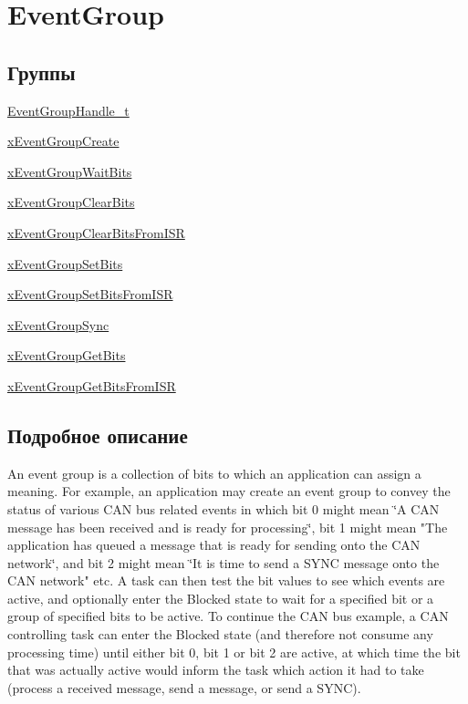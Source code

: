 \hypertarget{group___event_group}{}\section{Event\+Group}
\label{group___event_group}
\subsection*{Группы}
\begin{DoxyCompactItemize}
\item 
\mbox{\hyperlink{group___event_group_handle__t}{Event\+Group\+Handle\+\_\+t}}
\item 
\mbox{\hyperlink{group__x_event_group_create}{x\+Event\+Group\+Create}}
\item 
\mbox{\hyperlink{group__x_event_group_wait_bits}{x\+Event\+Group\+Wait\+Bits}}
\item 
\mbox{\hyperlink{group__x_event_group_clear_bits}{x\+Event\+Group\+Clear\+Bits}}
\item 
\mbox{\hyperlink{group__x_event_group_clear_bits_from_i_s_r}{x\+Event\+Group\+Clear\+Bits\+From\+I\+SR}}
\item 
\mbox{\hyperlink{group__x_event_group_set_bits}{x\+Event\+Group\+Set\+Bits}}
\item 
\mbox{\hyperlink{group__x_event_group_set_bits_from_i_s_r}{x\+Event\+Group\+Set\+Bits\+From\+I\+SR}}
\item 
\mbox{\hyperlink{group__x_event_group_sync}{x\+Event\+Group\+Sync}}
\item 
\mbox{\hyperlink{group__x_event_group_get_bits}{x\+Event\+Group\+Get\+Bits}}
\item 
\mbox{\hyperlink{group__x_event_group_get_bits_from_i_s_r}{x\+Event\+Group\+Get\+Bits\+From\+I\+SR}}
\end{DoxyCompactItemize}


\subsection{Подробное описание}
An event group is a collection of bits to which an application can assign a meaning. For example, an application may create an event group to convey the status of various C\+AN bus related events in which bit 0 might mean \char`\"{}\+A C\+A\+N
message has been received and is ready for processing\char`\"{}, bit 1 might mean "The application has queued a message that is ready for sending onto the C\+AN network\char`\"{}, and bit 2 might mean \char`\"{}It is time to send a S\+Y\+NC message onto the C\+AN network" etc. A task can then test the bit values to see which events are active, and optionally enter the Blocked state to wait for a specified bit or a group of specified bits to be active. To continue the C\+AN bus example, a C\+AN controlling task can enter the Blocked state (and therefore not consume any processing time) until either bit 0, bit 1 or bit 2 are active, at which time the bit that was actually active would inform the task which action it had to take (process a received message, send a message, or send a S\+Y\+NC).

